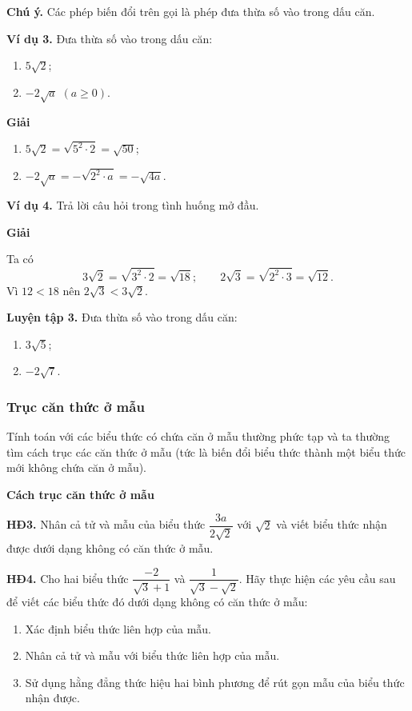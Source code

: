 \begin{lesson}
    \textbf{Chú ý.} Các phép biến đổi trên gọi là phép đưa thừa số vào trong dấu căn.

    \textbf{Ví dụ 3.} Đưa thừa số vào trong dấu căn:
    \begin{enumerate}[label=\alph*)]
        \item $5\sqrt2$;
        \item $-2\sqrt a$ $(a\ge0)$.
    \end{enumerate}

    \textbf{Giải}
    \begin{enumerate}[label=\alph*)]
        \item $5\sqrt2=\sqrt{5^2\cdot2}=\sqrt{50}$;
        \item $-2\sqrt a=-\sqrt{2^2\cdot a}=-\sqrt{4a}$.
    \end{enumerate}

    \textbf{Ví dụ 4.} Trả lời câu hỏi trong tình huống mở đầu.

    \textbf{Giải}

    Ta có
    \[
        3\sqrt2=\sqrt{3^2\cdot2}=\sqrt{18};
        \qquad
        2\sqrt3=\sqrt{2^2\cdot3}=\sqrt{12}.
    \]
    Vì $12<18$ nên $2\sqrt3<3\sqrt2$.

    \textbf{Luyện tập 3.} Đưa thừa số vào trong dấu căn:
    \begin{enumerate}[label=\alph*)]
        \item $3\sqrt5$;
        \item $-2\sqrt7$.
    \end{enumerate}

    \answerline

    \subsubsection{Trục căn thức ở mẫu}

    Tính toán với các biểu thức có chứa căn ở mẫu thường phức tạp và ta thường tìm cách trục các căn thức ở mẫu (tức là biến đổi biểu thức thành một biểu thức mới không chứa căn ở mẫu).

    \textbf{Cách trục căn thức ở mẫu}

    \textbf{HĐ3.} Nhân cả tử và mẫu của biểu thức $\dfrac{3a}{2\sqrt2}$ với $\sqrt2$ và viết biểu thức nhận được dưới dạng không có căn thức ở mẫu.

    \answerline

    \textbf{HĐ4.} Cho hai biểu thức $\dfrac{-2}{\sqrt3+1}$ và $\dfrac1{\sqrt3-\sqrt2}$. Hãy thực hiện các yêu cầu sau để viết các biểu thức đó dưới dạng không có căn thức ở mẫu:
    \begin{enumerate}[label=\alph*)]
        \item Xác định biểu thức liên hợp của mẫu.
        \item Nhân cả tử và mẫu với biểu thức liên hợp của mẫu.
        \item Sử dụng hằng đẳng thức hiệu hai bình phương để rút gọn mẫu của biểu thức nhận được.
    \end{enumerate}


\end{lesson}
